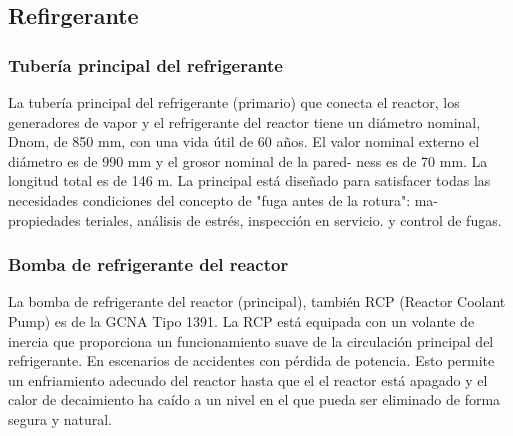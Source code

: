 \documentclass[]{article}
\begin{document}


\subsection{Refirgerante}

 \subsubsection{Tubería principal del refrigerante}

La tubería principal del refrigerante (primario) que conecta
el reactor, los generadores de vapor y el refrigerante del reactor
tiene un diámetro nominal, Dnom, de 850 mm,
con una vida útil de 60 años. El valor nominal externo
el diámetro es de 990 mm y el grosor nominal de la pared-
ness es de 70 mm. La longitud total es de 146 m. La principal
está diseñado para satisfacer todas las necesidades
condiciones del concepto de "fuga antes de la rotura": ma-
propiedades teriales, análisis de estrés, inspección en servicio.
y control de fugas.\citep{Rosatom}\\

\subsubsection{Bomba de refrigerante del reactor}

La bomba de refrigerante del reactor (principal), también RCP (Reactor Coolant Pump) es de la GCNA Tipo 1391. La RCP está equipada con un volante de inercia que proporciona un funcionamiento suave de la circulación principal del refrigerante. En escenarios de accidentes con pérdida de potencia. Esto permite un enfriamiento adecuado del reactor hasta que el
el reactor está apagado y el calor de decaimiento ha caído
a un nivel en el que pueda ser eliminado de forma segura y natural.\\

\end{document}
